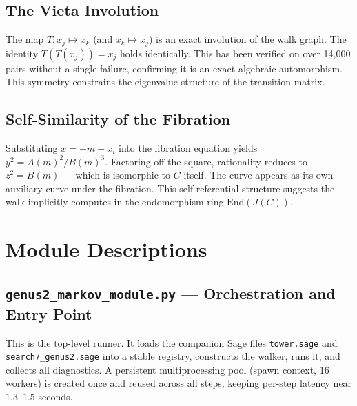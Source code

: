 \documentclass[11pt]{article}
\theoremstyle{definition}
\theoremstyle{remark}
\newcommand{\End}{\mathrm{End}}
\begin{document}
\subsection{The Vieta Involution}

The map $T\colon x_j \mapsto x_k$ (and $x_k \mapsto x_j$) is an exact
involution of the walk graph. The identity $T(T(x_j)) = x_j$ holds
identically. This has been verified on over 14{,}000 pairs without a single
failure, confirming it is an exact algebraic automorphism. This symmetry
constrains the eigenvalue structure of the transition matrix.

\subsection{Self-Similarity of the Fibration}

Substituting $x = -m + x_i$ into the fibration equation yields
$y^2 = A(m)^2 / B(m)^3$. Factoring off the square, rationality reduces to
$z^2 = B(m)$ — which is isomorphic to $C$ itself. The curve appears as its own
auxiliary curve under the fibration. This self-referential structure suggests
the walk implicitly computes in the endomorphism ring $\End(J(C))$.

\section{Module Descriptions}
\label{sec:modules}

\subsection{\texttt{genus2\_markov\_module.py} — Orchestration and Entry Point}

This is the top-level runner. It loads the companion Sage files
\texttt{tower.sage} and \texttt{search7\_genus2.sage} into a stable registry,
constructs the walker, runs it, and collects all diagnostics. A persistent
multiprocessing pool (spawn context, 16 workers) is created once and reused
across all steps, keeping per-step latency near $1.3$--$1.5$ seconds.

\end{document}
